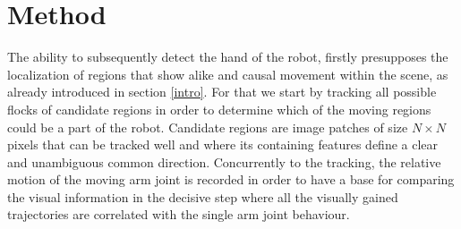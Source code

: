 \documentclass[conference]{IEEEtran}
\begin{document}
%

%
%





%
%
\section{Method}\label{method}
The ability to subsequently detect the hand of the robot, firstly presupposes the localization of regions that show alike and causal movement within the scene, as already introduced in section \ref{intro}. For that we start by tracking all possible flocks of candidate regions in order to determine which of the moving regions could be a part of the robot. Candidate regions are image patches of size $N \times N$ pixels that can be tracked well and where its containing features define a clear and unambiguous common direction. Concurrently to the tracking, the relative motion of the moving arm joint is recorded in order to have a base for comparing the visual information in the decisive step where all the visually gained trajectories are correlated with the single arm joint behaviour. 
%
%
%
%
\end{document}
